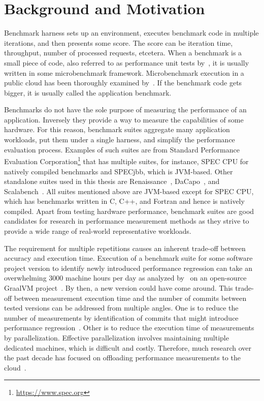 \chapter{Background and Motivation}
\label{chap:background}

Benchmark harness sets up an environment, executes benchmark code in multiple iterations, and then presents some score.
The score can be iteration time, throughput, number of processed requests, etcetera.
When a benchmark is a small piece of code, also referred to as performance unit tests by~\citet{horky2015unit}, it is usually written in some microbenchmark framework.
Microbenchmark execution in a public cloud has been thoroughly examined by~\citet{laaber2019software}.
If the benchmark code gets bigger, it is usually called the application benchmark.

Benchmarks do not have the sole purpose of measuring the performance of an application.
Inversely they provide a way to measure the capabilities of some hardware.
For this reason, benchmark suites aggregate many application workloads, put them under a single harness, and simplify the performance evaluation process.
Examples of such suites are from Standard Performance Evaluation Corporation\footnote{\url{https://www.spec.org}} that has multiple suites, for instance, SPEC CPU for natively compiled benchmarks and SPECjbb, which is \mbox{JVM-based}.
Other standalone suites used in this thesis are Renaissance~\cite{prokopec2019renaissance}, DaCapo~\cite{blackburn2006dacapo}, and Scalabench~\cite{sewe2011capo}.
All suites mentioned above are \mbox{JVM-based} except for SPEC CPU, which has benchmarks written in C, C++, and Fortran and hence is natively compiled.
Apart from testing hardware performance, benchmark suites are good candidates for research in performance measurement methods as they strive to provide a wide range of real-world representative workloads.

The requirement for multiple repetitions causes an inherent trade-off between accuracy and execution time.
Execution of a benchmark suite for some software project version to identify newly introduced performance regression can take an overwhelming 3000 machine hours per day as analyzed by~\citet{bulej2020duet} on an open-source GraalVM project~\cite{oracleGraal}.
By then, a new version could have come around.
This trade-off between measurement execution time and the number of commits between tested versions can be addressed from multiple angles.
One is to reduce the number of measurements by identification of commits that might introduce performance regression~\citet{oliveira2017perphecy}.
Other is to reduce the execution time of measurements by parallelization.
Effective parallelization involves maintaining multiple dedicated machines, which is difficult and costly.
Therefore, much research over the past decade has focused on offloading performance measurements to the cloud~\cite{leitner2016patterns, laaber2019software, abedi2017conducting}.

